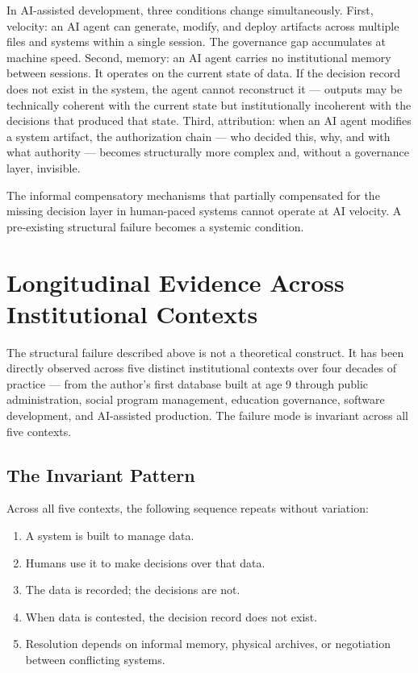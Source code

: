 \documentclass[conference]{IEEEtran}
\begin{document}
In AI-assisted development, three conditions change simultaneously. First, velocity: an AI agent can generate, modify, and deploy artifacts across multiple files and systems within a single session. The governance gap accumulates at machine speed. Second, memory: an AI agent carries no institutional memory between sessions. It operates on the current state of data. If the decision record does not exist in the system, the agent cannot reconstruct it --- outputs may be technically coherent with the current state but institutionally incoherent with the decisions that produced that state. Third, attribution: when an AI agent modifies a system artifact, the authorization chain --- who decided this, why, and with what authority --- becomes structurally more complex and, without a governance layer, invisible.

The informal compensatory mechanisms that partially compensated for the missing decision layer in human-paced systems cannot operate at AI velocity. A pre-existing structural failure becomes a systemic condition.

\section{Longitudinal Evidence Across Institutional Contexts}

The structural failure described above is not a theoretical construct. It has been directly observed across five distinct institutional contexts over four decades of practice --- from the author's first database built at age 9 through public administration, social program management, education governance, software development, and AI-assisted production. The failure mode is invariant across all five contexts.

\subsection{The Invariant Pattern}

Across all five contexts, the following sequence repeats without variation:

\begin{enumerate}
  \item A system is built to manage data.
  \item Humans use it to make decisions over that data.
  \item The data is recorded; the decisions are not.
  \item When data is contested, the decision record does not exist.
  \item Resolution depends on informal memory, physical archives, or negotiation between conflicting systems.
\end{enumerate}
\end{document}
